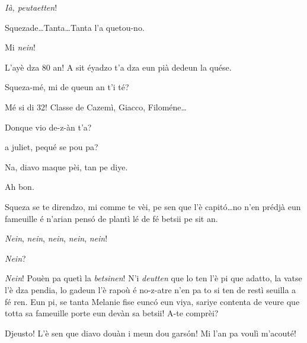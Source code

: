\begin{drama}
\Peterspeaks{} \textit{Ià, peutaetten}!

\scene[-- R.I.P. Tanta]


\Cesarspeaks{} Squezade\ldots Tanta\ldots Tanta l’a quetou-no.

\Hermannspeaks Mi \textit{nein}!


\Battistaspeaks{}  L’ayè dza 80 an! A sit éyadzo t’a dza eun pià dedeun la quése.


\Hermannspeaks{} Squeza-mé, mi de queun an t'i té?

\Battistaspeaks Mé si di 32! Classe de Cazemì, Giacco, Filoméne\ldots

\Hermannspeaks Donque vio de-z-àn t’a?

 a juliet, pequé se pou pa?

\Hermannspeaks Na, diavo maque pèi, tan pe diye.

\Battistaspeaks Ah bon.

\Cesarspeaks{} Squeza se te direndzo, mi comme te vèi, pe sen que l'è capit\'o\ldots no n'en prédjà eun fameuille é n'arian pens\'o de plantì lé de fé betsii pe sit an.


\Hermannspeaks \textit{Nein}, \textit{nein}, \textit{nein}, \textit{nein}, \textit{nein}!

\Cesarspeaks{} \textit{Nein}?

\Hermannspeaks{} \textit{Nein}! Pouèn pa quetì la \textit{betsinen}! N'i \textit{deutten} que lo ten l'è pi que adatto, la vatse l'è dza pendia, lo gadeun l'è rapoù é no-z-atre n'en pa to si ten de restì seuilla a fé ren. Eun pi, se tanta Melanie fise eunc\'o eun viya, sariye contenta de veure que totta sa fameuille porte eun devàn sa betsii!  A-te comprèi?

\Cesarspeaks{} Djeusto! L'è sen que diavo douàn i meun dou gars\'on! Mi l'an pa voulì m'acouté!


\end{drama}
